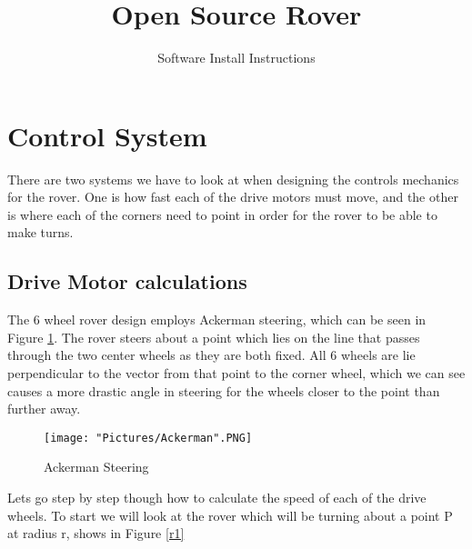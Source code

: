\documentclass[12pt]{article}
\begin{document}
\title{Open Source Rover}
\author{Software Install Instructions}

\makeatletter         
\def\@maketitle{
\begin{center}	
	\makebox[\textwidth][c]{ \texttt{[image: "Pictures/software title".png]}}
	{\Huge \bfseries \sffamily \@title }\\[4ex] 
	{\huge \bfseries \sffamily \@author}\\[4ex] 
	\texttt{[image: "Pictures/JPL logo".png]}
\end{center}}
\makeatother

\maketitle

\newpage

\tableofcontents

\newpage


\section{Control System}

There are two systems we have to look at when designing the controls mechanics for the rover. One is how fast each of the drive motors must move, and the other is where each of the corners need to point in order for the rover to be able to make turns. 

\subsection{Drive Motor calculations}
The 6 wheel rover design employs Ackerman steering, which can be seen in Figure \ref{Ackerman}. The rover steers about a point which lies on the line that passes through the two center wheels as they are both fixed. All 6 wheels are lie perpendicular to the vector from that point to the corner wheel, which we can see causes a more drastic angle in steering for the wheels closer to the point than further away. 

\begin{figure}[H]
 	\centering
	\texttt{[image: "Pictures/Ackerman".PNG]}
 	\caption{Ackerman Steering}
	\label{Ackerman}
\end{figure}

Lets go step by step though how to calculate the speed of each of the drive wheels. To start we will look at the rover which will be turning about a point P at radius r, shows in Figure \ref{r1}
\end{document}
